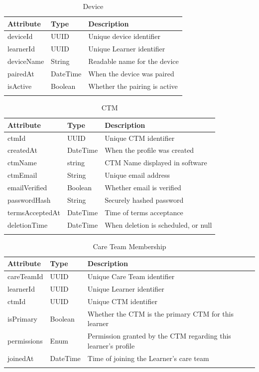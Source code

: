 \documentclass[12pt]{article}
\begin{document}
\begin{longtable}{p{} p{} p{}}
\toprule
Attribute & Type & Description\\
\midrule
deviceId & UUID & Unique device identifier\\
learnerId & UUID & Unique Learner identifier\\
deviceName & String & Readable name for the device\\
pairedAt & DateTime & When the device was paired\\
isActive & Boolean & Whether the pairing is active\\
\bottomrule
\caption{Device} \label{tab:Device}
\end{longtable}

\begin{longtable}{p{} p{} p{}}
\toprule
Attribute & Type & Description\\
\midrule
ctmId & UUID & Unique CTM identifier\\
createdAt & DateTime & When the profile was created\\
ctmName & string & CTM Name displayed in software\\
ctmEmail & String & Unique email address\\
emailVerified & Boolean & Whether email is verified\\
passwordHash & String & Securely hashed password\\
termsAcceptedAt & DateTime & Time of terms acceptance\\
deletionTime & DateTime & When deletion is scheduled, or null\\

\bottomrule
\caption{CTM} \label{tab:CTM}
\end{longtable}

\begin{longtable}{p{} p{} p{}}
\toprule
Attribute & Type & Description\\
\midrule
careTeamId & UUID & Unique Care Team identifier\\
learnerId & UUID & Unique Learner identifier\\
ctmId & UUID & Unique CTM identifier\\
isPrimary & Boolean & Whether the CTM is the primary CTM for this learner\\
permissions & Enum & Permission granted by the CTM regarding this learner's profile\\
joinedAt & DateTime & Time of joining the Learner's care team\\

\bottomrule
\caption{Care Team Membership} \label{tab:Care Team Membership}
\end{longtable}
\end{document}
